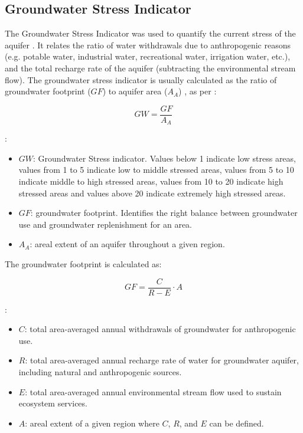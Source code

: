 \subsection{Groundwater Stress Indicator}
The Groundwater Stress Indicator was used to quantify the current stress of the aquifer \cite{Aqueductglobalmaps2015}. It relates the ratio of water withdrawals due to anthropogenic reasons (e.g. potable water, industrial water, recreational water, irrigation water, etc.), and the total recharge rate of the aquifer (subtracting the environmental stream flow). The groundwater stress indicator is usually calculated as the ratio of groundwater footprint ($GF$) to aquifer area ($A_A$) \cite{RegionalGroundwaterStress2013}, as per :

\begin{equation}\label{eq:7} 
GW = \frac{GF}{A_{A}}
\end{equation}

:
\begin{itemize}[label={-}]
	\item $GW$: Groundwater Stress indicator. Values below 1 indicate low stress areas, values from 1 to 5 indicate low to middle stressed areas, values from 5 to 10 indicate middle to high stressed areas, values from 10 to 20 indicate high stressed areas and values above 20 indicate extremely high stressed areas.
	\item $GF$: groundwater footprint. Identifies the right balance between groundwater use and groundwater replenishment for an area.
	\item $A_A$: areal extent of an aquifer throughout a given region.
\end{itemize}

The groundwater footprint is calculated as:

\begin{equation}\label{eq:8} 
GF = \frac{C}{R-E}\cdot A
\end{equation}

:
\begin{itemize}[label={-}]
	\item $C$: total area-averaged annual withdrawals of groundwater for anthropogenic use.
	\item $R$: total area-averaged annual recharge rate of water for groundwater aquifer, including natural and anthropogenic sources.
	\item $E$: total area-averaged annual environmental stream flow used to sustain ecosystem services.
	\item $A$: areal extent of a given region where $C$, $R$, and $E$ can be defined.
\end{itemize}

